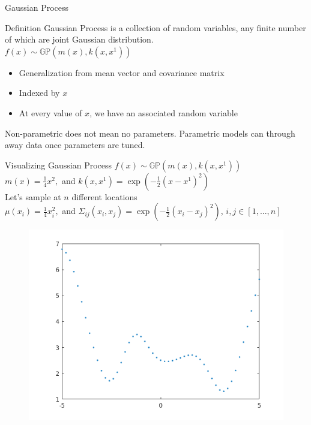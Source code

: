 \begin{frame}{Gaussian Process}
    \begin{block}{Definition}
        Gaussian Process is a collection of random variables, any finite number
        of which are joint Gaussian distribution. \\
$f(x) \sim \mathbb{GP}(m(x),k(x,x^1))$
    \end{block}
    \begin{itemize}
        \item Generalization from mean vector and covariance matrix
        \item Indexed by $x$
        \item At every value of $x$, we have an associated random variable
        \end{itemize}

    Non-parametric does not mean no parameters. Parametric models can through
    away data once parameters are tuned.
\end{frame}

\begin{frame}{Visualizing Gaussian Process}
$f(x) \sim \mathbb{GP}(m(x),k(x,x^1))$ \\
$m(x) = \frac{1}{4}x^2,$ and $k(x,x^1) = \exp{(-\frac{1}{2}(x-x^1)^2)}$\\
Let's sample at $n$ different locations\\
$\mu(x_i) = \frac{1}{4}x_i^2,$ and $\Sigma_{ij}(x_i,x_j) =
\exp{(-\frac{1}{2}(x_i-x_j)^2)}$, $i,j \in [1,...,n]$
\begin{figure}
\centering
\includegraphics[width=0.5\linewidth]{figures/converted_sampling_gp}
\end{figure}
\end{frame}

